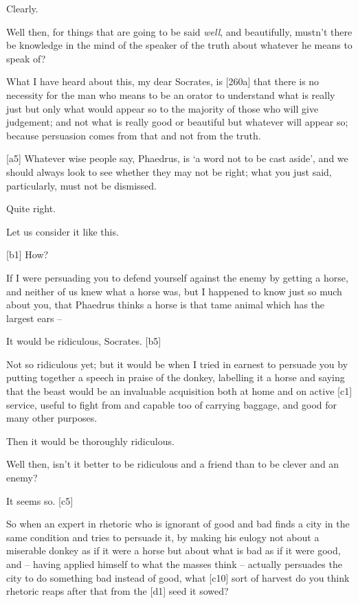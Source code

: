  Clearly.

 Well then, for things that are going to be said {\em well}, and
beautifully, mustn't there be knowledge in the mind of the speaker of
the truth about whatever he means to speak of?

 What I have heard about this, my dear Socrates, is {[}260a{]}
that there is no necessity for the man who means to be an orator to
understand what is really just but only what would appear so to the
majority of those who will give judgement; and not what is really good
or beautiful but whatever will appear so; because persuasion comes from
that and not from the truth.

{[}a5{]}  Whatever wise people say, Phaedrus, is ‘a word not to
be cast aside', and we
should always look to see whether they may not be right; what you just
said, particularly, must not be dismissed.

 Quite right.

 Let us consider it like this.

{[}b1{]}  How?

 If I were persuading you to defend yourself against the enemy
by getting a horse, and neither of us knew what a horse was, but I
happened to know just so much about you, that Phaedrus thinks a horse is
that tame animal which has the largest ears --

 It would be ridiculous, Socrates. {[}b5{]}

 Not so ridiculous yet; but it would be when I tried in earnest
to persuade you by putting together a speech in praise of the donkey,
labelling it a horse and saying that the beast would be an invaluable
acquisition both at home and on active {[}c1{]} service, useful to fight
from and capable too of carrying baggage, and good for many other
purposes.

 Then it would be thoroughly ridiculous.

 Well then, isn't it better to be ridiculous and a friend than
to be clever and an enemy?

 It seems so. {[}c5{]}

 So when an expert in rhetoric who is ignorant of good and bad
finds a city in the same condition and tries to persuade it, by making
his eulogy not about a miserable donkey as if it were a horse but about
what is bad as if it were good, and -- having applied himself to what
the masses think -- actually persuades the city to do something bad
instead of good, what {[}c10{]} sort of harvest do you think rhetoric
reaps after that from the {[}d1{]} seed it sowed?

